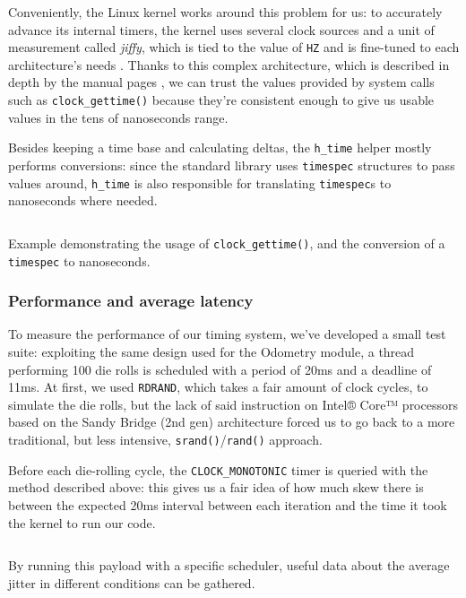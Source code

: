 \documentclass[a4paper,12pt]{report}
\begin{document}
Conveniently, the Linux kernel works around this problem for us: to accurately advance its internal timers, the kernel uses several clock sources and a unit of measurement called \textit{jiffy}, which is tied to the value of \texttt{HZ} and is fine-tuned to each architecture's needs \cite{elinux-hrts}. Thanks to this complex architecture, which is described in depth by the manual pages \cite{man-clock-getres-2}, we can trust the values provided by system calls such as \texttt{clock\_gettime()} because they're consistent enough to give us usable values in the tens of nanoseconds range.

Besides keeping a time base and calculating deltas, the \texttt{h\_time} helper mostly performs conversions: since the standard library uses \texttt{timespec} structures to pass values around, \texttt{h\_time} is also responsible for translating \texttt{timespec}s to nanoseconds where needed.

\begin{listing}[H]
\inputminted[frame=single,framesep=10pt]{c}{snippets/time.c}
\caption{Example demonstrating the usage of \texttt{clock\_gettime()}, and the conversion of a \texttt{timespec} to nanoseconds.}
\end{listing}

\subsubsection{Performance and average latency}

To measure the performance of our timing system, we've developed a small test suite: exploiting the same design used for the Odometry module, a thread performing 100 die rolls is scheduled with a period of 20ms and a deadline of 11ms. At first, we used \texttt{RDRAND}, which takes a fair amount of clock cycles,  to simulate the die rolls, but the lack of said instruction on Intel® Core™ processors based on the Sandy Bridge (2nd gen) architecture forced us to go back to a more traditional, but less intensive, \texttt{srand()}/\texttt{rand()} approach.

Before each die-rolling cycle, the \texttt{CLOCK\_MONOTONIC} timer is queried with the method described above: this gives us a fair idea of how much skew there is between the expected 20ms interval between each iteration and the time it took the kernel to run our code.

\begin{listing}[H]
\inputminted[frame=single,framesep=10pt]{c}{snippets/latency-test.c}
\caption{By running this payload with a specific scheduler, useful data about the average jitter in different conditions can be gathered.}
\end{listing}
\end{document}
